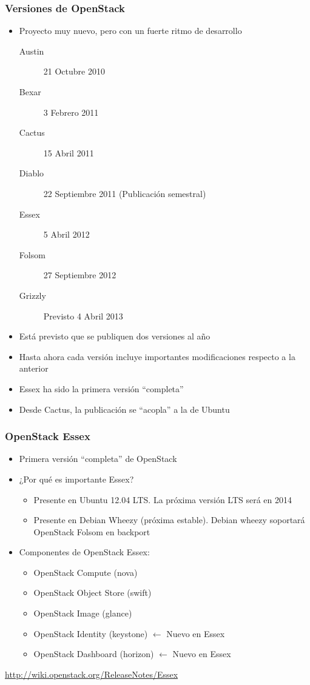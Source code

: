 \documentclass{beamer}
\begin{document}
\begin{frame}
  \frametitle{Versiones de OpenStack}
  \begin{itemize}
  \item Proyecto muy nuevo, pero con un fuerte ritmo de desarrollo
    \begin{description}
    \item[Austin] 21 Octubre 2010
    \item[Bexar] 3 Febrero 2011
    \item[Cactus] 15 Abril 2011
    \item[Diablo] 22 Septiembre 2011 (Publicación semestral)
    \item[Essex] 5 Abril 2012
    \item[Folsom] 27 Septiembre 2012
    \item[Grizzly] Previsto 4 Abril 2013
    \end{description}
  \item Está previsto que se publiquen dos versiones al año
  \item Hasta ahora cada versión incluye importantes modificaciones respecto a
    la anterior
  \item Essex ha sido la primera versión ``completa''
  \item Desde Cactus, la publicación se ``acopla'' a la de Ubuntu
  \end{itemize}
\end{frame}

\begin{frame}[fragile]
  \frametitle{OpenStack Essex}
  \begin{itemize}
  \item Primera versión ``completa'' de OpenStack
  \item ¿Por qué es importante Essex?
    \begin{itemize}
    \item Presente en Ubuntu 12.04 LTS. La próxima versión LTS será en 2014
    \item Presente en Debian Wheezy (próxima estable). Debian wheezy soportará
      OpenStack Folsom en backport
    \end{itemize}
  \item Componentes de OpenStack Essex:
    \begin{itemize}
    \item OpenStack Compute (nova)
    \item OpenStack Object Store (swift)
    \item OpenStack Image (glance)
    \item OpenStack Identity (keystone) $\leftarrow$ Nuevo en Essex
    \item OpenStack Dashboard (horizon) $\leftarrow$ Nuevo en Essex
    \end{itemize}
  \end{itemize}
  \url{http://wiki.openstack.org/ReleaseNotes/Essex}
\end{frame}
\end{document}
